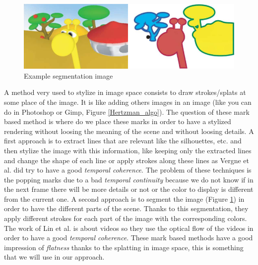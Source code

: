 \begin{figure}
    \begin{center}

    \includegraphics[scale=0.5]{pics/segmentation_example.png}
    \end{center}
    \caption{Example segmentation image\cite{benard_state---art_2011}}
    \label{segmenation_example}
\end{figure}

A method very used to stylize in image space consists to draw strokes/splats at some place of the image\cite{bleron_motion-coherent_2018, vergne_implicit_2011, benard_active_nodate, zeng_image_2009, grabli_programmable_2010}. It is like adding others images in an image (like you can do in Photoshop or Gimp, Figure \ref{Hertzman_algo}). The question of these mark based method is where do we place these marks in order to have a stylized rendering without loosing the meaning of the scene and without loosing details. A first approach is to extract lines that are relevant like the silhouettes, etc. \cite{vergne_implicit_2011, grabli_programmable_2010, lee_line_nodate} and then stylize the image with this information, like keeping only the extracted lines and change the shape of each line or apply strokes along these lines as Vergne et al.\cite{vergne_implicit_2011} did try to have a good \textit{temporal coherence}. The problem of these techniques is the popping marks due to a bad \textit{temporal continuity} because we do not know if in the next frame there will be more details or not or the color to display is different from the current one.
A second approach is to segment the image (Figure \ref{segmenation_example}) in order to have the different parts of the scene\cite{zeng_image_2009, lin_video_nodate}. Thanks to this segmentation, they apply different strokes for each part of the image with the corresponding colors. The work of Lin et al.\cite{lin_video_nodate} is about videos so they use the optical flow of the videos in order to have a good \textit{temporal coherence}. These mark based methods have a good impression of \textit{flatness} thanks to the splatting in image space, this is something that we will use in our approach.

